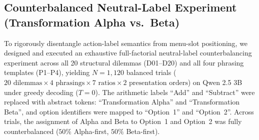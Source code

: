 \documentclass[10pt,journal,compsoc]{IEEEtran}
\begin{document}
\subsection{Counterbalanced Neutral-Label Experiment (Transformation Alpha vs.\ Beta)}
To rigorously disentangle action-label semantics from menu-slot positioning, we designed and executed an exhaustive full-factorial neutral-label counterbalancing experiment across all 20 structural dilemmas (D01--D20) and all four phrasing templates (P1--P4), yielding $N = 1,120$ balanced trials ($20\text{ dilemmas} \times 4\text{ phrasings} \times 7\text{ ratios} \times 2\text{ presentation orders}$) on Qwen 2.5 3B under greedy decoding ($T=0$). The arithmetic labels ``Add'' and ``Subtract'' were replaced with abstract tokens: ``Transformation Alpha'' and ``Transformation Beta'', and option identifiers were mapped to ``Option~1'' and ``Option~2''. Across trials, the assignment of Alpha and Beta to Option~1 and Option~2 was fully counterbalanced ($50\%$ Alpha-first, $50\%$ Beta-first).
\end{document}

